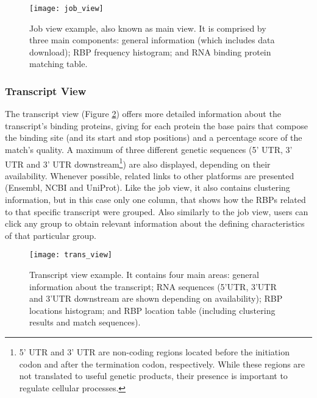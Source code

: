 \begin{figure}[!htb]
  \begin{center}
    \leavevmode
    \texttt{[image: job\_view]}
    \caption[Job view example]{
      Job view example, also known as main view. It is comprised by three main
      components: general information (which includes data download); RBP
      frequency histogram; and RNA binding protein matching table.
    }
    \label{fig:job_view}
  \end{center}
\end{figure}

\subsubsection*{Transcript View}

The transcript view (Figure \ref{fig:trans_view}) offers more detailed
information about the transcript's binding proteins, giving for each protein the
base pairs that compose the binding site (and its start and stop positions) and
a percentage score of the match's quality. A maximum of three different genetic
sequences (5’ UTR, 3’ UTR and 3’ UTR downstream\footnote{5' UTR and 3' UTR are
non-coding regions located before the initiation codon and after the termination
codon, respectively. While these regions are not translated to useful genetic
products, their presence is important to regulate cellular processes.}) are also
displayed, depending on their availability. Whenever possible, related links to
other platforms are presented (Ensembl, NCBI and UniProt). Like the job view, it
also contains clustering information, but in this case only one column, that
shows how the RBPs related to that specific transcript were grouped. Also
similarly to the job view, users can click any group to obtain relevant
information about the defining characteristics of that particular group.

\begin{figure}[!htb]
  \begin{center}
    \leavevmode
    \texttt{[image: trans\_view]}
    \caption[Transcript view example]{
      Transcript view example. It contains four main areas: general information
      about the transcript; RNA sequences (5’UTR, 3’UTR and 3’UTR downstream are
      shown depending on availability); RBP locations histogram; and RBP
      location table (including clustering results and match sequences).
    }
    \label{fig:trans_view}
  \end{center}
\end{figure}

